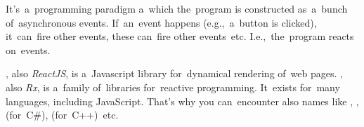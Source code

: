 It's~a~programming paradigm a~which the~program is constructed as~a~bunch of~asynchronous events.
If~an~event happens (e.g.,~a~button is clicked), it~can~fire other events, these can~fire other events~etc.
I.e.,~the~program reacts on~events.

\begin{itemize}
    , also \textit{ReactJS}, is a~Javascript library for~dynamical rendering of~web pages.
    , also \textit{Rx}, is a~family of~libraries for~reactive programming.
            It~exists for~many languages, including JavaScript.
            That's why you can~encounter also names like , ,  \mbox{(for C\#)},  \mbox{(for C++) etc.}
\end{itemize}
